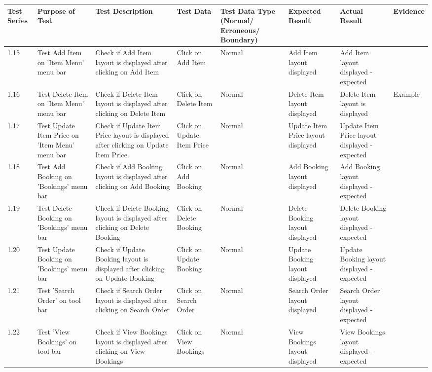 \begin{landscape}
\begin{center}
    \begin{longtable}{|p{1.5cm}|p{2.5cm}|p{2.5cm}|p{2cm}|p{2cm}|p{2cm}|p{2cm}|p{2cm}|}
        \hline
        \textbf{Test Series} & \textbf{Purpose of Test} & \textbf{Test Description} & \textbf{Test Data} & \textbf{Test Data Type (Normal/ Erroneous/ Boundary)} & \textbf{Expected Result} & \textbf{Actual Result} & \textbf{Evidence}\\ \hline
       1.15 & Test Add Item on 'Item Menu' menu bar & Check if Add Item layout is displayed after clicking on Add Item & Click on Add Item & Normal & Add Item layout displayed & Add Item layout displayed - expected &  \\ \hline
       1.16 & Test Delete Item on 'Item Menu' menu bar & Check if Delete Item layout is displayed after clicking on Delete Item & Click on Delete Item & Normal & Delete Item layout displayed & Delete Item layout is displayed & Example \\ \hline
       1.17 & Test Update Item Price on 'Item Menu' menu bar & Check if Update Item Price layout is displayed after clicking on Update Item Price & Click on Update Item Price & Normal & Update Item Price layout displayed & Update Item Price layout displayed - expected & \\ \hline
       1.18 & Test Add Booking on 'Bookings' menu bar & Check if Add Booking layout is displayed after clicking on Add Booking & Click on Add Booking & Normal & Add Booking layout displayed &Add Booking layout displayed - expected &  \\ \hline
       1.19 & Test Delete Booking on 'Bookings' menu bar & Check if Delete Booking layout is displayed after clicking on Delete Booking & Click on Delete Booking & Normal & Delete Booking layout displayed & Delete Booking layout displayed - expected & \\ \hline
       1.20 & Test Update Booking on 'Bookings' menu bar & Check if Update Booking layout is displayed after clicking on Update Booking & Click on Update Booking & Normal & Update Booking layout displayed & Update Booking layout displayed - expected &  \\ \hline
       1.21 & Test 'Search Order' on tool bar & Check if Search Order layout is displayed after clicking on Search Order & Click on Search Order & Normal & Search Order layout displayed & Search Order layout displayed - expected & \\ \hline
       1.22 & Test 'View Bookings' on tool bar & Check if View Bookings layout is displayed after clicking on View Bookings & Click on View Bookings & Normal & View Bookings layout displayed & View Bookings layout displayed - expected &  \\ \hline

\end{longtable}
\end{center}
\end{landscape}
